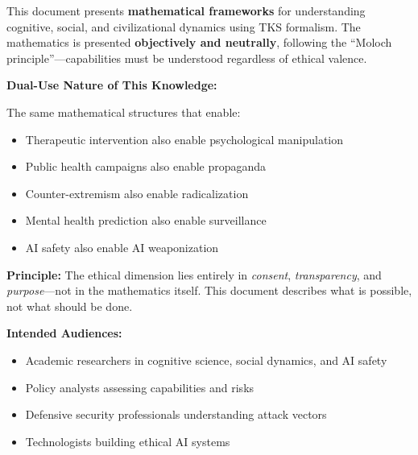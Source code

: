 \documentclass[11pt,twoside]{book}
\theoremstyle{definition}
\theoremstyle{plain}
\theoremstyle{remark}
\begin{document}
\begin{tcolorbox}[colback=red!5!white,colframe=red!75!black,title=\textbf{Critical Ethical Statement},breakable]
This document presents \textbf{mathematical frameworks} for understanding cognitive, social, and civilizational dynamics using TKS formalism. The mathematics is presented \textbf{objectively and neutrally}, following the ``Moloch principle''---capabilities must be understood regardless of ethical valence.

\textbf{Dual-Use Nature of This Knowledge:}

The same mathematical structures that enable:
\begin{itemize}
    \item Therapeutic intervention also enable psychological manipulation
    \item Public health campaigns also enable propaganda
    \item Counter-extremism also enable radicalization
    \item Mental health prediction also enable surveillance
    \item AI safety also enable AI weaponization
\end{itemize}

\textbf{Principle:} The ethical dimension lies entirely in \textit{consent}, \textit{transparency}, and \textit{purpose}---not in the mathematics itself. This document describes what is possible, not what should be done.

\textbf{Intended Audiences:}
\begin{itemize}
    \item Academic researchers in cognitive science, social dynamics, and AI safety
    \item Policy analysts assessing capabilities and risks
    \item Defensive security professionals understanding attack vectors
    \item Technologists building ethical AI systems
\end{itemize}
\end{tcolorbox}
\end{document}
